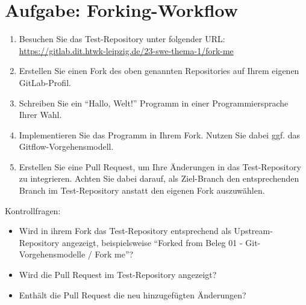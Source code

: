 
\section{Aufgabe: Forking\hyp Workflow}
\label{sec:task:forking}


\begin{enumerate}
    \item Besuchen Sie das Test\hyp Repository unter folgender URL: \url{https://gitlab.dit.htwk-leipzig.de/23-swe-thema-1/fork-me}
    
    \item Erstellen Sie einen Fork des oben genannten Repositories auf Ihrem eigenen GitLab\hyp Profil.
  
    \item Schreiben Sie ein \enquote{Hallo, Welt!} Programm in einer Programmiersprache Ihrer Wahl.
  
    \item Implementieren Sie das Programm in Ihrem Fork. Nutzen Sie dabei ggf. das Gitflow\hyp Vorgehensmodell.
  
    \item Erstellen Sie eine Pull Request, um Ihre Änderungen in das Test\hyp Repository zu integrieren. Achten Sie dabei darauf, als Ziel\hyp Branch den entsprechenden Branch im Test\hyp Repository anstatt den eigenen Fork auszuwählen.
  
\end{enumerate}

Kontrollfragen:

\begin{itemize}
  \item Wird in ihrem Fork das Test\hyp Repository entsprechend als Upstream\hyp Repository angezeigt, beispielsweise \enquote{Forked from Beleg 01 - Git-Vorgehensmodelle / Fork me}?

  \item Wird die Pull Request im Test\hyp Repository angezeigt? 
  
  \item Enthält die Pull Request die neu hinzugefügten Änderungen?
\end{itemize}
